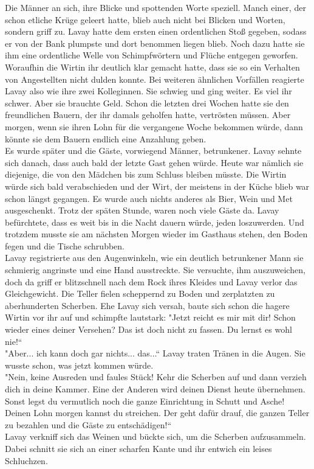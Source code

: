 Die Männer an sich, ihre Blicke und spottenden Worte speziell. Manch einer, der schon etliche Krüge 
geleert hatte, blieb auch nicht bei Blicken und Worten, sondern griff zu. Lavay hatte dem ersten 
einen ordentlichen Stoß gegeben, sodass er von der Bank plumpste und dort benommen liegen blieb. 
Noch dazu hatte sie ihm eine ordentliche Welle von Schimpfwörtern und Flüche entgegen geworfen. 
Woraufhin die Wirtin ihr deutlich klar gemacht hatte, dass sie so ein Verhalten von Angestellten 
nicht dulden konnte. Bei weiteren ähnlichen Vorfällen reagierte Lavay also wie ihre zwei 
Kolleginnen. Sie schwieg und ging weiter. Es viel ihr schwer. Aber sie brauchte Geld. Schon die 
letzten drei Wochen hatte sie den freundlichen Bauern, der ihr damals geholfen hatte, vertrösten 
müssen. Aber morgen, wenn sie ihren Lohn für die vergangene Woche bekommen würde, dann könnte sie 
dem Bauern endlich eine Anzahlung geben.\\
Es wurde später und die Gäste, vorwiegend Männer, betrunkener. Lavay sehnte sich danach, dass auch 
bald der letzte Gast gehen würde. Heute war nämlich sie diejenige, die von den Mädchen bis zum 
Schluss bleiben müsste. Die Wirtin würde sich bald verabschieden und der Wirt, der meistens in der 
Küche blieb war schon längst gegangen. Es wurde auch nichts anderes als Bier, Wein und Met 
ausgeschenkt. Trotz der späten Stunde, waren noch viele Gäste da. Lavay befürchtete, dass es weit 
bis in die Nacht dauern würde, jeden loszuwerden. Und trotzdem musste sie am nächsten Morgen wieder 
im Gasthaus stehen, den Boden fegen und die Tische schrubben.\\
Lavay registrierte aus den Augenwinkeln, wie ein deutlich betrunkener Mann sie schmierig angrinste 
und eine Hand ausstreckte. Sie versuchte, ihm auszuweichen, doch da griff er blitzschnell nach dem 
Rock ihres Kleides und Lavay verlor das Gleichgewicht. Die Teller fielen scheppernd zu Boden und 
zerplatzten zu aberhunderten Scherben. Ehe Lavay sich versah, baute sich schon die hagere Wirtin 
vor ihr auf und schimpfte lautstark: "Jetzt reicht es mir mit dir! Schon wieder eines deiner 
Versehen? Das ist doch nicht zu fassen. Du lernst es wohl nie!``\\
"Aber... ich kann doch gar nichts... das...`` Lavay traten Tränen in die Augen. Sie wusste schon, 
was jetzt kommen würde.\\
"Nein, keine Ausreden und faules Stück! Kehr die Scherben auf und dann verzieh dich in deine 
Kammer. Eine der Anderen wird deinen Dienst heute übernehmen. Sonst legst du vermutlich noch die 
ganze Einrichtung in Schutt und Asche! Deinen Lohn morgen kannst du streichen. Der geht dafür 
drauf, die ganzen Teller zu bezahlen und die Gäste zu entschädigen!``\\
Lavay verkniff sich das Weinen und bückte sich, um die Scherben aufzusammeln. Dabei schnitt sie 
sich an einer scharfen Kante und ihr entwich ein leises Schluchzen.\\


